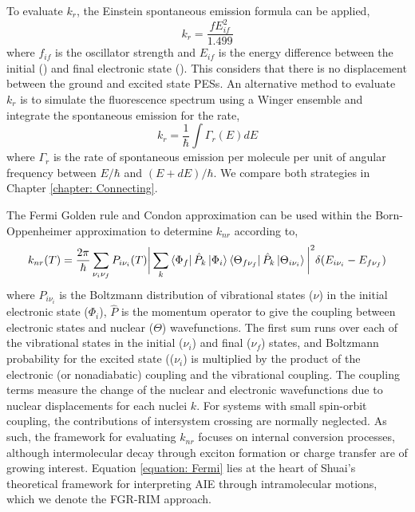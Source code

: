 To evaluate $k_{r}$, the Einstein spontaneous emission formula can be applied,\cite{Yui2005}
\begin{equation}\label{equation: Einstein_rate}
    k_{r}=\frac{fE_{if}^{2}}{1.499}
\end{equation}
where $f_{if}$ is the oscillator strength and $E_{if}$ is the energy difference between the initial (\sone{}) and final electronic state (\szero{}). This considers that there is no displacement between the ground and excited state \acp{PES}. An alternative method to evaluate $k_{r}$ is to simulate the fluorescence spectrum using a Winger ensemble and integrate the spontaneous emission for the rate,
\begin{equation}\label{equation: integrated_emission_rate}
    k_{r}=\frac{1}{\hbar}\int{\Gamma_{r}(E)dE}
\end{equation}
where $\Gamma_{r}$ is the rate of spontaneous emission per molecule per unit of angular frequency between $E/\hbar$ and $(E+d
E)/\hbar$.\cite{Niu2010,Crespo-Otero2012}
We compare both strategies in Chapter \ref{chapter: Connecting}.  

The Fermi Golden rule and Condon approximation can be used within the Born-Oppenheimer approximation to determine $k_{nr}$ according to,\cite{Yin2006}
\begin{equation}\label{equation: Fermi}
    k_{nr}(T)=\frac{2\pi}{\hbar}\sum_{\nu_{i}\nu_{f}}P_{i\nu_{i}}(T)\bigg|\sum_{k}\bra{\Phi_{f}}\hat{P}_{k}\ket{\Phi_{i}}\bra{\Theta_{f\nu_{f}}}\hat{P}_{k}\ket{\Theta_{i\nu_{i}}}\bigg|^{2}\delta{}(E_{i\nu_{i}}-E_{f\nu_{f}})
\end{equation}
where $P_{i\nu_{i}}$ is the Boltzmann distribution of vibrational states ($\nu$) in the initial electronic state ($\Phi_{i}$), $\hat{P}$ is the momentum operator to give the coupling between electronic states and nuclear ($\Theta$) wavefunctions. The first sum runs over each of the vibrational states in the initial ($\nu_{i}$) and final ($\nu_{f}$)  states, and Boltzmann probability for the excited state (($\nu_{i}$) is multiplied by the product of the electronic (or nonadiabatic) coupling and the vibrational coupling. The coupling terms measure the change of the nuclear and electronic wavefunctions due to nuclear displacements for each nuclei $k$. For systems with small spin-orbit coupling, the contributions of intersystem crossing are normally neglected. As such, the framework for evaluating $k_{nr}$ focuses on internal conversion processes, although intermolecular decay through exciton formation or charge transfer are of growing interest.\cite{Li2017} Equation \ref{equation: Fermi} lies at the heart of Shuai's theoretical framework for interpreting AIE through intramolecular motions, which we denote the \ac{FGR-RIM} approach.

